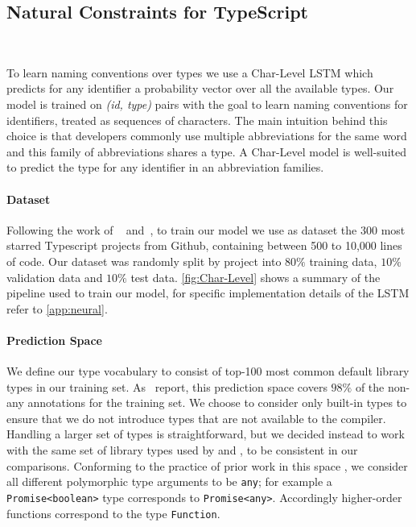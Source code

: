 \documentclass[acmsmall, review, anonymous]{acmart}\settopmatter{printfolios=true,printccs=false,printacmref=false}
\begin{document}
\subsection{Natural Constraints for TypeScript}~\label{ssec:natprodts}

To learn naming conventions over types we use a Char-Level LSTM which predicts for any identifier a probability vector over all the available types. Our model is trained on
\textit{(id, type)} pairs with the goal to learn naming conventions
for identifiers, treated as sequences of characters.
The main intuition behind this choice is that
developers commonly use multiple abbreviations for the same word and
this family of abbreviations shares a type.
A Char-Level model is well-suited to predict the type for any identifier in
an abbreviation families.

\paragraph{Dataset} Following the work of 
~\citet{wei20} and~\citet{hellendoorn18},
to train our model we use as dataset the 300 
most starred Typescript projects from Github, 
containing between 500 to 10,000 lines of code.
Our dataset was randomly split by project into $80\%$ training data, $10\%$ validation data and $10\%$ test data. \cref{fig:Char-Level} shows a summary of the pipeline used to train our model, for specific implementation details of the LSTM refer to \cref{app:neural}.

\paragraph{Prediction Space}
We define our type vocabulary to consist of top-100 most common default library types in our training set. As~\citet{wei20} report, this prediction space covers $98\%$ of the non-any annotations for the training set. We choose to consider only built-in types 
to ensure that we do not introduce types that are not available to the compiler. Handling a larger set of types is straightforward, but we decided instead to work with the same set of library types used by \citet{hellendoorn18} and \citet{wei20}, to be consistent in our comparisons.
Conforming to the practice of prior work in this space \cite{wei20,hellendoorn18,xu16,raychev15}, 
we consider all different polymorphic type arguments to be \texttt{\small{any}}; for example a \texttt{\small{Promise<boolean>}} type corresponds to \texttt{\small{Promise<any>}}.
%
Accordingly higher-order functions correspond to the type \texttt{\small{Function}}.
\end{document}
